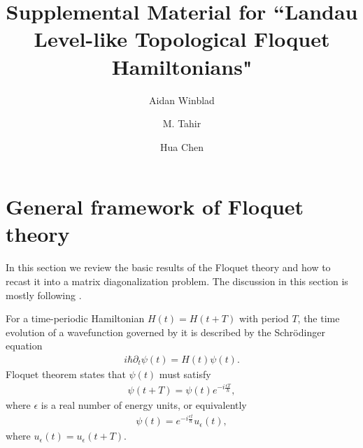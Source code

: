 \documentclass[aps,prb,showpacs,amsmath,amssymb,superscriptaddress]{revtex4-2}
\begin{document}
\title{Supplemental Material for ``Landau Level-like Topological Floquet Hamiltonians"}

\author{Aidan Winblad}

\author{M. Tahir}

\author{Hua Chen}

\maketitle

\section{General framework of Floquet theory}\label{app:quantum-floquet-theory}

In this section we review the basic results of the Floquet theory and how to recast it into a matrix diagonalization problem. 
The discussion in this section is mostly following \cite{AEE}.

For a time-periodic Hamiltonian $H(t) = H(t+T)$ with period $T$, the time evolution of a wavefunction governed by it is described by the Schr\"{o}dinger equation
\begin{eqnarray}\label{eq:SchrHt}
	i\hbar \partial_t \psi(t) = H(t) \psi(t).
\end{eqnarray}
Floquet theorem states that $\psi(t)$ must satisfy
\begin{eqnarray}
	\psi(t+T) = \psi(t) e^{-i \frac{\epsilon T}{\hbar}},
\end{eqnarray}
where $\epsilon$ is a real number of energy units, or equivalently
\begin{eqnarray}
	\psi(t) = e^{-i \frac{\epsilon t}{\hbar}} u_{\epsilon}(t),
\end{eqnarray}
where $u_{\epsilon}(t) = u_{\epsilon}(t+T)$.
\end{document}
